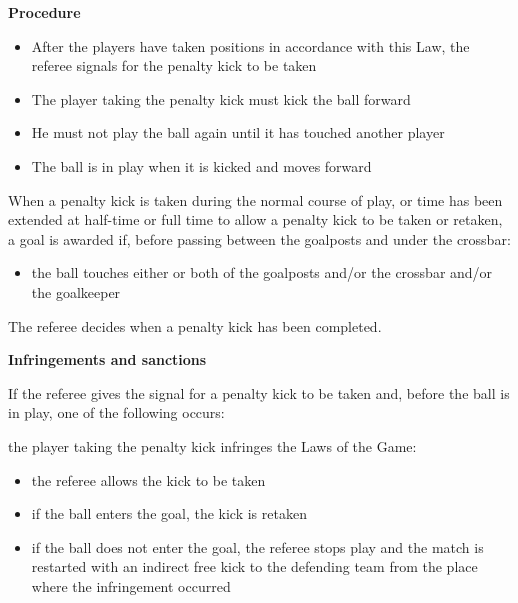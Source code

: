 \bigskip

{\bfseries Procedure}

\headlinebox

\begin{itemize}
\item After the players have taken positions in accordance with this Law, the
referee signals for the penalty kick to be taken
\item The player taking the penalty kick must kick the ball forward
\item He must not play the ball again until it has touched another player
\item The ball is in play when it is kicked and moves forward
\end{itemize}

When a penalty kick is taken during the normal course of play, or time
has been extended at half-time or full time to allow a penalty kick to
be taken or retaken, a goal is awarded if, before passing between the
goalposts and under the crossbar:

\begin{itemize}
\item the ball touches either or both of the goalposts and/or the crossbar
and/or the goalkeeper 
\end{itemize}

\bigskip

The referee decides when a penalty kick has been completed.

\bigskip

{\bfseries Infringements and sanctions }

\headlinebox

If the referee gives the signal for a penalty kick to be taken and,
before the ball is in play, one of the following occurs:

the player taking the penalty kick infringes the Laws of the Game:

\begin{itemize}
\item the referee allows the kick to be taken
\item if the ball enters the goal, the kick is retaken
\item if the ball does not enter the goal, the referee stops play and the
match is restarted with an indirect free kick to the defending team
from the place where the infringement occurred
\end{itemize}

\bigskip

